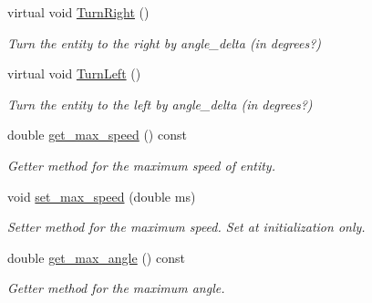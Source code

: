 \begin{DoxyCompactItemize}
virtual void \mbox{\hyperlink{class_motion_handler_a4299b69223b25b8f368b7b1059abbf60}{Turn\+Right}} ()
\begin{DoxyCompactList}\small\item\em Turn the entity to the right by angle\+\_\+delta (in degrees?) \end{DoxyCompactList}\item 
\mbox{\label{class_motion_handler_a8af761f4ada79a6685e7e6dd4d23657e}} 
virtual void \mbox{\hyperlink{class_motion_handler_a8af761f4ada79a6685e7e6dd4d23657e}{Turn\+Left}} ()
\begin{DoxyCompactList}\small\item\em Turn the entity to the left by angle\+\_\+delta (in degrees?) \end{DoxyCompactList}\item 
\mbox{\label{class_motion_handler_a71e2e4cdddfb8c49eb18cf41878a08c0}} 
double \mbox{\hyperlink{class_motion_handler_a71e2e4cdddfb8c49eb18cf41878a08c0}{get\+\_\+max\+\_\+speed}} () const
\begin{DoxyCompactList}\small\item\em Getter method for the maximum speed of entity. \end{DoxyCompactList}\item 
\mbox{\label{class_motion_handler_a32e832d35e73e9db85c16b3ff569196e}} 
void \mbox{\hyperlink{class_motion_handler_a32e832d35e73e9db85c16b3ff569196e}{set\+\_\+max\+\_\+speed}} (double ms)
\begin{DoxyCompactList}\small\item\em Setter method for the maximum speed. Set at initialization only. \end{DoxyCompactList}\item 
\mbox{\label{class_motion_handler_af6ef42cdbf31ec1589e14d5dfd639d79}} 
double \mbox{\hyperlink{class_motion_handler_af6ef42cdbf31ec1589e14d5dfd639d79}{get\+\_\+max\+\_\+angle}} () const
\begin{DoxyCompactList}\small\item\em Getter method for the maximum angle. \end{DoxyCompactList}\item 
\mbox{\label{class_motion_handler_aa73973c705626f1f95ac59391f23bcc9}} 

\end{DoxyCompactItemize}
